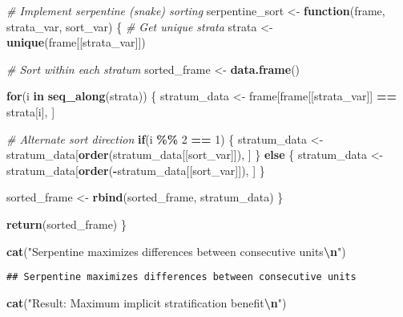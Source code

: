 \documentclass[
]{article}
\newenvironment{Shaded}{\begin{snugshade}}{\end{snugshade}}
\newcommand{\CommentTok}[1]{\textcolor[rgb]{0.56,0.35,0.01}{\textit{#1}}}
\newcommand{\ControlFlowTok}[1]{\textcolor[rgb]{0.13,0.29,0.53}{\textbf{#1}}}
\newcommand{\DecValTok}[1]{\textcolor[rgb]{0.00,0.00,0.81}{#1}}
\newcommand{\FunctionTok}[1]{\textcolor[rgb]{0.13,0.29,0.53}{\textbf{#1}}}
\newcommand{\NormalTok}[1]{#1}
\newcommand{\OtherTok}[1]{\textcolor[rgb]{0.56,0.35,0.01}{#1}}
\newcommand{\SpecialCharTok}[1]{\textcolor[rgb]{0.81,0.36,0.00}{\textbf{#1}}}
\newcommand{\StringTok}[1]{\textcolor[rgb]{0.31,0.60,0.02}{#1}}
\begin{document}
\begin{Shaded}
\begin{Highlighting}[]
\CommentTok{\# Implement serpentine (snake) sorting}
\NormalTok{serpentine\_sort }\OtherTok{\textless{}{-}} \ControlFlowTok{function}\NormalTok{(frame, strata\_var, sort\_var) \{}
  \CommentTok{\# Get unique strata}
\NormalTok{  strata }\OtherTok{\textless{}{-}} \FunctionTok{unique}\NormalTok{(frame[[strata\_var]])}
  
  \CommentTok{\# Sort within each stratum}
\NormalTok{  sorted\_frame }\OtherTok{\textless{}{-}} \FunctionTok{data.frame}\NormalTok{()}
  
  \ControlFlowTok{for}\NormalTok{(i }\ControlFlowTok{in} \FunctionTok{seq\_along}\NormalTok{(strata)) \{}
\NormalTok{    stratum\_data }\OtherTok{\textless{}{-}}\NormalTok{ frame[frame[[strata\_var]] }\SpecialCharTok{==}\NormalTok{ strata[i], ]}
    
    \CommentTok{\# Alternate sort direction}
    \ControlFlowTok{if}\NormalTok{(i }\SpecialCharTok{\%\%} \DecValTok{2} \SpecialCharTok{==} \DecValTok{1}\NormalTok{) \{}
\NormalTok{      stratum\_data }\OtherTok{\textless{}{-}}\NormalTok{ stratum\_data[}\FunctionTok{order}\NormalTok{(stratum\_data[[sort\_var]]), ]}
\NormalTok{    \} }\ControlFlowTok{else}\NormalTok{ \{}
\NormalTok{      stratum\_data }\OtherTok{\textless{}{-}}\NormalTok{ stratum\_data[}\FunctionTok{order}\NormalTok{(}\SpecialCharTok{{-}}\NormalTok{stratum\_data[[sort\_var]]), ]}
\NormalTok{    \}}
    
\NormalTok{    sorted\_frame }\OtherTok{\textless{}{-}} \FunctionTok{rbind}\NormalTok{(sorted\_frame, stratum\_data)}
\NormalTok{  \}}
  
  \FunctionTok{return}\NormalTok{(sorted\_frame)}
\NormalTok{\}}

\FunctionTok{cat}\NormalTok{(}\StringTok{"Serpentine maximizes differences between consecutive units}\SpecialCharTok{\textbackslash{}n}\StringTok{"}\NormalTok{)}
\end{Highlighting}
\end{Shaded}

\begin{verbatim}
## Serpentine maximizes differences between consecutive units
\end{verbatim}

\begin{Shaded}
\begin{Highlighting}[]
\FunctionTok{cat}\NormalTok{(}\StringTok{"Result: Maximum implicit stratification benefit}\SpecialCharTok{\textbackslash{}n}\StringTok{"}\NormalTok{)}
\end{Highlighting}
\end{Shaded}
\end{document}
